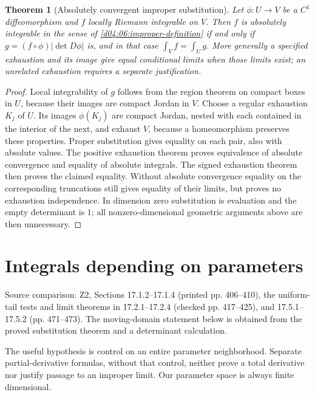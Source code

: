 \documentclass[11pt,oneside,openany]{book}
\newtheorem{theorem}{Theorem}[chapter]
\theoremstyle{definition}
\theoremstyle{remark}
\newcommand{\family}[1]{}
\newcommand{\source}[1]{\par\begingroup\small\sffamily\color{black!65}Source comparison: #1\par\endgroup}
\begin{document}
\family{K04.07.10}
\begin{theorem}[Absolutely convergent improper substitution]\label{d04:07:improper}
Let $\phi:U\to V$ be a $C^1$ diffeomorphism and $f$ locally Riemann integrable on $V$. Then $f$ is absolutely integrable in the sense of \cref{d04:06:improper-definition} if and only if $g=(f\circ\phi)|\det D\phi|$ is, and in that case $\int_Vf=\int_Ug$. More generally a specified exhaustion and its image give equal conditional limits when those limits exist; an unrelated exhaustion requires a separate justification.
\end{theorem}
\begin{proof}
Local integrability of $g$ follows from the region theorem on compact boxes in $U$, because their images are compact Jordan in $V$. Choose a regular exhaustion $K_j$ of $U$. Its images $\phi(K_j)$ are compact Jordan, nested with each contained in the interior of the next, and exhaust $V$, because a homeomorphism preserves these properties. Proper substitution gives equality on each pair, also with absolute values. The positive exhaustion theorem proves equivalence of absolute convergence and equality of absolute integrals. The signed exhaustion theorem then proves the claimed equality. Without absolute convergence equality on the corresponding truncations still gives equality of their limits, but proves no exhaustion independence. In dimension zero substitution is evaluation and the empty determinant is $1$; all nonzero-dimensional geometric arguments above are then unnecessary.
\end{proof}



\chapter{Integrals depending on parameters}
\label{ch:d04-08}
\source{Z2, Sections 17.1.2--17.1.4 (printed pp. 406--410), the uniform-tail tests and limit theorems in 17.2.1--17.2.4 (checked pp. 417--425), and 17.5.1--17.5.2 (pp. 471--473). The moving-domain statement below is obtained from the proved substitution theorem and a determinant calculation.}

The useful hypothesis is control on an entire parameter neighborhood. Separate partial-derivative formulas, without that control, neither prove a total derivative nor justify passage to an improper limit. Our parameter space is always finite dimensional.
\end{document}
